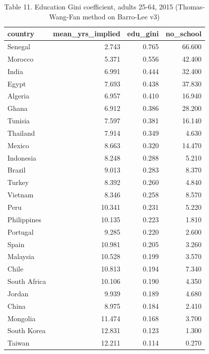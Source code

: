 \begin{table}
\caption{Table 11. Education Gini coefficient, adults 25-64, 2015 (Thomas-Wang-Fan method on Barro-Lee v3)}
\label{tab:T11_education_gini}
\begin{tabular}{lrrr}
\toprule
country & mean\_yrs\_implied & edu\_gini & no\_school \\
\midrule
Senegal & 2.743 & 0.765 & 66.600 \\
Morocco & 5.371 & 0.556 & 42.400 \\
India & 6.991 & 0.444 & 32.400 \\
Egypt & 7.693 & 0.438 & 37.830 \\
Algeria & 6.957 & 0.410 & 16.940 \\
Ghana & 6.912 & 0.386 & 28.200 \\
Tunisia & 7.597 & 0.381 & 16.140 \\
Thailand & 7.914 & 0.349 & 4.630 \\
Mexico & 8.663 & 0.320 & 14.470 \\
Indonesia & 8.248 & 0.288 & 5.210 \\
Brazil & 9.013 & 0.283 & 8.370 \\
Turkey & 8.392 & 0.260 & 4.840 \\
Vietnam & 8.346 & 0.258 & 8.570 \\
Peru & 10.341 & 0.231 & 5.220 \\
Philippines & 10.135 & 0.223 & 1.810 \\
Portugal & 9.285 & 0.220 & 2.600 \\
Spain & 10.981 & 0.205 & 3.260 \\
Malaysia & 10.528 & 0.199 & 3.570 \\
Chile & 10.813 & 0.194 & 7.340 \\
South Africa & 10.106 & 0.190 & 4.350 \\
Jordan & 9.939 & 0.189 & 4.680 \\
China & 8.975 & 0.184 & 2.410 \\
Mongolia & 11.474 & 0.168 & 3.700 \\
South Korea & 12.831 & 0.123 & 1.300 \\
Taiwan & 12.211 & 0.114 & 0.270 \\
\bottomrule
\end{tabular}
\end{table}
